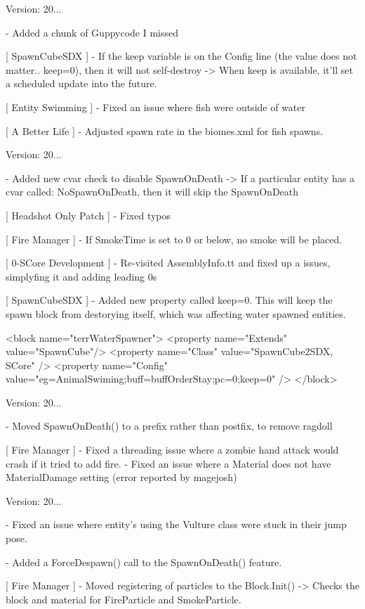  Version\+: 20... \begin{DoxyVerb}
    - Added a chunk of Guppycode I missed

[ SpawnCubeSDX ]
    - If the keep variable is on the Config line (the value does not matter.. keep=0), then it will not self-destroy
        -> When keep is available, it'll set a scheduled update into the future.

[ Entity Swimming ]
    - Fixed an issue where fish were outside of water

[ A Better Life ]
    - Adjusted spawn rate in the biomes.xml for fish spawns.
\end{DoxyVerb}
 Version\+: 20... \begin{DoxyVerb}
    - Added new cvar check to disable SpawnOnDeath
        -> If a particular entity has a cvar called: NoSpawnOnDeath, then it will skip the SpawnOnDeath

[ Headshot Only Patch ]
    - Fixed typos

[ Fire Manager ]
    - If SmokeTime is set to 0 or below, no smoke will be placed.

[ 0-SCore Development ]
    - Re-visited AssemblyInfo.tt and fixed up a issues, simplyfing it and adding leading 0s

[ SpawnCubeSDX ]
    - Added new property called keep=0. This will keep the spawn block from destorying itself, which was affecting water spawned entities.

    <block name="terrWaterSpawner">
      <property name="Extends" value="SpawnCube"/>
      <property name="Class" value="SpawnCube2SDX, SCore" />
      <property name="Config" value="eg=AnimalSwiming;buff=buffOrderStay;pc=0;keep=0" />
  </block>
\end{DoxyVerb}
 Version\+: 20... \begin{DoxyVerb}
    - Moved SpawnOnDeath() to a prefix rather than postfix, to remove ragdoll

[ Fire Manager ]
    - Fixed a threading issue where a zombie hand attack would crash if it tried to add fire.
    - Fixed an issue where a Material does not have MaterialDamage setting (error reported by magejosh)
\end{DoxyVerb}
 Version\+: 20... \begin{DoxyVerb}
    - Fixed an issue where entity's using the Vulture class were stuck in their jump pose.

    - Added a ForceDespawn() call to the SpawnOnDeath() feature.

[ Fire Manager ]
    - Moved registering of particles to the Block.Init()
        -> Checks the block and material for FireParticle and SmokeParticle.
\end{DoxyVerb}


